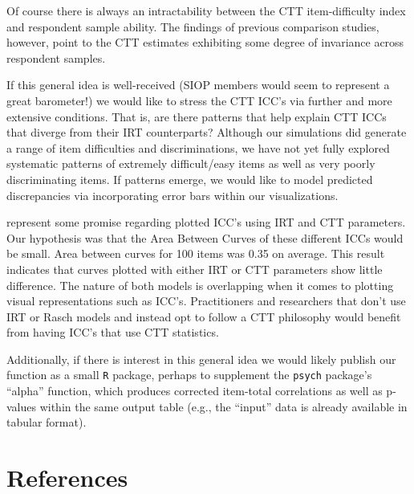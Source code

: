 \documentclass[
  man]{apa6}
\begin{document}
Of course there is always an intractability between the CTT item-difficulty index and respondent sample ability. The findings of previous comparison studies, however, point to the CTT estimates exhibiting some degree of invariance across respondent samples.

If this general idea is well-received (SIOP members would seem to represent a great barometer!) we would like to stress the CTT ICC's via further and more extensive conditions. That is, are there patterns that help explain CTT ICCs that diverge from their IRT counterparts? Although our simulations did generate a range of item difficulties and discriminations, we have not yet fully explored systematic patterns of extremely difficult/easy items as well as very poorly discriminating items. If patterns emerge, we would like to model predicted discrepancies via incorporating error bars within our visualizations.

represent some promise regarding plotted ICC's using IRT and CTT parameters. Our hypothesis was that the Area Between Curves of these different ICCs would be small. Area between curves for 100 items was 0.35 on average. This result indicates that curves plotted with either IRT or CTT parameters show little difference. The nature of both models is overlapping when it comes to plotting visual representations such as ICC's. Practitioners and researchers that don't use IRT or Rasch models and instead opt to follow a CTT philosophy would benefit from having ICC's that use CTT statistics.

Additionally, if there is interest in this general idea we would likely publish our function as a small \texttt{R} package, perhaps to supplement the \texttt{psych} package's ``alpha'' function, which produces corrected item-total correlations as well as p-values within the same output table (e.g., the ``input'' data is already available in tabular format).

\newpage

\hypertarget{references}{%
\section{References}\label{references}}

\begingroup
\setlength{\parindent}{-0.5in}
\setlength{\leftskip}{0.5in}
\end{document}
